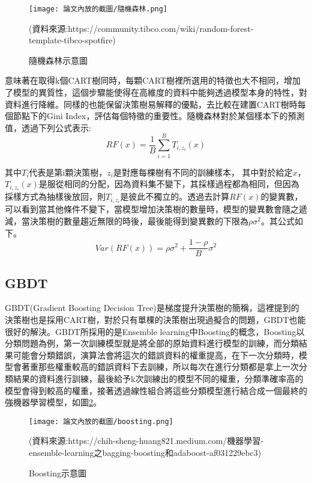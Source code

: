 	\begin{figure}[H]
	\centering
	\texttt{[image: 論文內放的截圖/隨機森林.png]}
	\caption{隨機森林示意圖}
	(資料來源:https://community.tibco.com/wiki/random-forest-template-tibco-spotfire)
	\label{Fi3g10}
	\end{figure}
	
\newpage
	
	意味著在取得k個CART樹同時，每顆CART樹裡所選用的特徵也大不相同，增加了模型的異質性，這個步驟能使得在高維度的資料中能夠透過模型本身的特性，對資料進行降維。同樣的也能保留決策樹易解釋的優點，去比較在建置CART樹時每個節點下的Gini Index，評估每個特徵的重要性。隨機森林對於某個樣本下的預測值，透過下列公式表示:
	$$RF(x)=\dfrac{1}{B}\sum_{i=1}^{B}T_{i,z_i}(x)$$

\noindent 其中$T_i$代表是第i顆決策樹，$z_i$是對應每棵樹有不同的訓練樣本，	其中對於給定$x$，$T_{i,z_i}(x)$是服從相同的分配，因為資料集不變下，其採樣過程都為相同，但因為採樣方式為抽樣後放回，則$T_{i,z_i}$是彼此不獨立的。透過去計算$RF(x)$的變異數，可以看到當其他條件不變下，當模型增加決策樹的數量時，模型的變異數會隨之遞減，當決策樹的數量趨近無限的時後，最後能得到變異數的下限為$\rho\sigma^2$。其公式如下。
	$$Var(RF(x))=\rho\sigma^2+\dfrac{1-\rho}{B}\sigma^2$$
	
\newpage

\subsection{GBDT}
	
	GBDT(Gradient Boosting Decision Tree)是梯度提升決策樹的簡稱，這裡提到的決策樹也是採用CART樹，對於只有單棵的決策樹出現過擬合的問題，GBDT也能很好的解決。GBDT所採用的是Ensemble learning中Boosting的概念，Boosting以分類問題為例，第一次訓練模型就是將全部的原始資料進行模型的訓練，而分類結果可能會分類錯誤，演算法會將這次的錯誤資料的權重提高，在下一次分類時，模型會著重那些權重較高的錯誤資料下去訓練，所以每次在進行分類都是拿上一次分類結果的資料進行訓練，最後給予k次訓練出的模型不同的權重，分類準確率高的模型會得到較高的權重，接著透過線性組合將這些分類模型進行結合成一個最終的強機器學習模型，如圖\ref{Fi3g11}。\\
	
	\begin{figure}[H]
	\centering
	\texttt{[image: 論文內放的截圖/boosting.png]}
	\caption{Boosting示意圖}
	(資料來源:https://chih-sheng-huang821.medium.com/機器學習-ensemble-learning之bagging-boosting和adaboost-af031229ebc3)  
	\label{Fi3g11}
	\end{figure}

